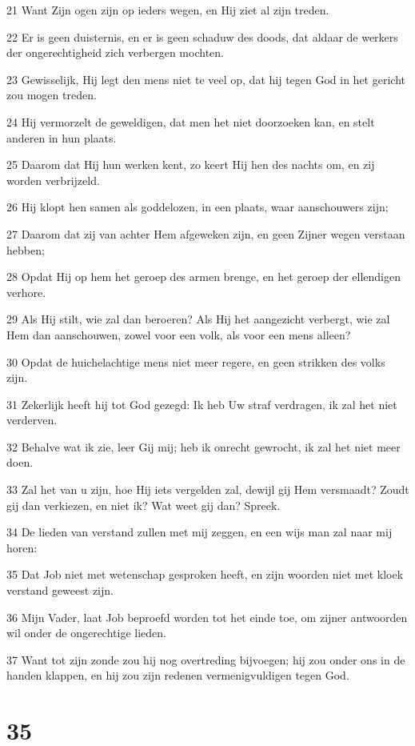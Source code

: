\par 21 Want Zijn ogen zijn op ieders wegen, en Hij ziet al zijn treden.
\par 22 Er is geen duisternis, en er is geen schaduw des doods, dat aldaar de werkers der ongerechtigheid zich verbergen mochten.
\par 23 Gewisselijk, Hij legt den mens niet te veel op, dat hij tegen God in het gericht zou mogen treden.
\par 24 Hij vermorzelt de geweldigen, dat men het niet doorzoeken kan, en stelt anderen in hun plaats.
\par 25 Daarom dat Hij hun werken kent, zo keert Hij hen des nachts om, en zij worden verbrijzeld.
\par 26 Hij klopt hen samen als goddelozen, in een plaats, waar aanschouwers zijn;
\par 27 Daarom dat zij van achter Hem afgeweken zijn, en geen Zijner wegen verstaan hebben;
\par 28 Opdat Hij op hem het geroep des armen brenge, en het geroep der ellendigen verhore.
\par 29 Als Hij stilt, wie zal dan beroeren? Als Hij het aangezicht verbergt, wie zal Hem dan aanschouwen, zowel voor een volk, als voor een mens alleen?
\par 30 Opdat de huichelachtige mens niet meer regere, en geen strikken des volks zijn.
\par 31 Zekerlijk heeft hij tot God gezegd: Ik heb Uw straf verdragen, ik zal het niet verderven.
\par 32 Behalve wat ik zie, leer Gij mij; heb ik onrecht gewrocht, ik zal het niet meer doen.
\par 33 Zal het van u zijn, hoe Hij iets vergelden zal, dewijl gij Hem versmaadt? Zoudt gij dan verkiezen, en niet ik? Wat weet gij dan? Spreek.
\par 34 De lieden van verstand zullen met mij zeggen, en een wijs man zal naar mij horen:
\par 35 Dat Job niet met wetenschap gesproken heeft, en zijn woorden niet met kloek verstand geweest zijn.
\par 36 Mijn Vader, laat Job beproefd worden tot het einde toe, om zijner antwoorden wil onder de ongerechtige lieden.
\par 37 Want tot zijn zonde zou hij nog overtreding bijvoegen; hij zou onder ons in de handen klappen, en hij zou zijn redenen vermenigvuldigen tegen God.

\chapter{35}

